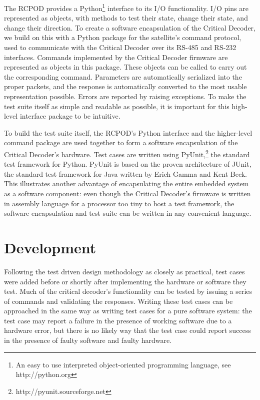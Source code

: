 \documentclass[letterpaper]{article}
\begin{document}
The RCPOD provides a Python\footnote{An easy to use interpreted object-oriented programming language, see http://python.org}
interface to its I/O functionality. I/O pins are represented as objects, with methods to test their state, change
their state, and change their direction. To create a software encapsulation of the Critical Decoder, we build on this
with a Python package for the satellite's command protocol, used to communicate with the Critical Decoder over
its RS-485 and RS-232 interfaces. Commands implemented by the Critical Decoder firmware
are represented as objects in this package. These objects can be called to carry out the corresponding command.
Parameters are automatically serialized into the proper packets, and the response is automatically
converted to the most usable representation possible. Errors are reported by raising exceptions. To
make the test suite itself as simple and readable as possible, it is important for this high-level interface package to be
intuitive.

To build the test suite itself, the RCPOD's Python interface and the higher-level command package are
used together to form a software encapsulation of the Critical Decoder's hardware. Test cases are written
using PyUnit,\footnote{http://pyunit.sourceforge.net} the standard test framework for Python. PyUnit is based
on the proven architecture of JUnit, the standard test framework for Java written by Erich Gamma and Kent Beck.
This illustrates another advantage of encapsulating the entire embedded system as a software component: even
though the Critical Decoder's firmware is written in assembly language for a processor too tiny to host a
test framework, the software encapsulation and test suite can be written in any convenient language.

\section{Development}

Following the test driven design methodology as closely as practical, test cases were added before or shortly
after implementing the hardware or software they test. Much of the critical decoder's functionality can be tested by issuing
a series of commands and validating the responses. Writing these test cases can be approached in the same way
as writing test cases for a pure software system: the test case may report a failure in the presence of working
software due to a hardware error, but there is no likely way that the test case could report success in the
presence of faulty software and faulty hardware.
\end{document}
